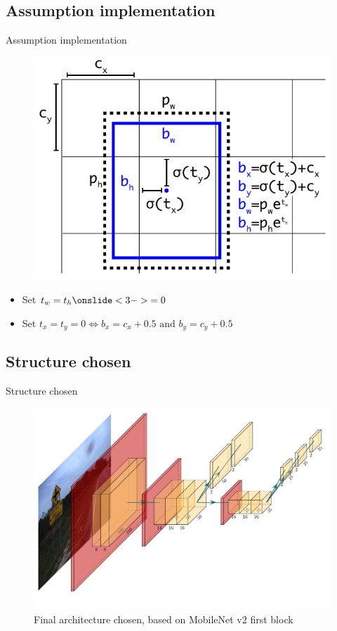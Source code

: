 \documentclass{beamer}
\begin{document}
\subsection{Assumption implementation}
\begin{frame}{Assumption implementation}
    \begin{figure}
        \centering
        \includegraphics[width=0.5\linewidth]{figures/anchors.png}
    \end{figure}{}
    \begin{itemize}
        \item Set $t_w = t_h \onslide<3->{=0}$ \pause
        \item Set $t_x = t_y = 0 \Leftrightarrow b_x = c_x + 0.5 \text{ and } b_y = c_y + 0.5$
    \end{itemize}{}
\end{frame}{}

\subsection{Structure chosen}
\begin{frame}{Structure chosen}
    \begin{figure}
        \centering
        \includegraphics[width=0.9\linewidth]{figures/my_arch.pdf}
        \caption{Final architecture chosen, based on MobileNet v2 first block}
    \end{figure}{}
\end{frame}{}
\end{document}
